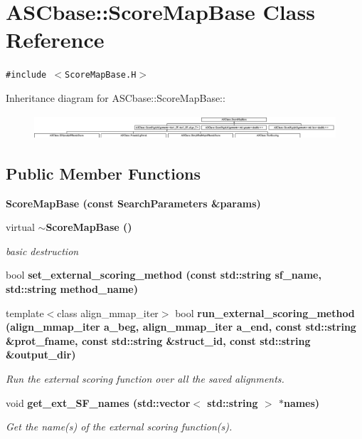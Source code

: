 \section{ASCbase::Score\-Map\-Base Class Reference}
\label{classASCbase_1_1ScoreMapBase}
{\tt \#include $<$Score\-Map\-Base.H$>$}

Inheritance diagram for ASCbase::Score\-Map\-Base::\begin{figure}[H]
\begin{center}
\leavevmode
\includegraphics[height=0.88189cm]{classASCbase_1_1ScoreMapBase}
\end{center}
\end{figure}
\subsection*{Public Member Functions}
\begin{CompactItemize}
\item 
\bf{Score\-Map\-Base} (const \bf{Search\-Parameters} \&params)
\item 
virtual \bf{$\sim$Score\-Map\-Base} ()\label{classASCbase_1_1ScoreMapBase_53cc54d782902810408e5e4ebcbbffd5}

\begin{CompactList}\small\item\em basic destruction \item\end{CompactList}\item 
bool \bf{set\_\-external\_\-scoring\_\-method} (const std::string sf\_\-name, std::string method\_\-name)
\item 
template$<$class align\_\-mmap\_\-iter$>$ bool \bf{run\_\-external\_\-scoring\_\-method} (align\_\-mmap\_\-iter a\_\-beg, align\_\-mmap\_\-iter a\_\-end, const std::string \&prot\_\-fname, const std::string \&struct\_\-id, const std::string \&output\_\-dir)
\begin{CompactList}\small\item\em Run the external scoring function over all the saved alignments. \item\end{CompactList}\item 
void \bf{get\_\-ext\_\-SF\_\-names} (std::vector$<$ std::string $>$ $\ast$names)\label{classASCbase_1_1ScoreMapBase_b5ee9de7e756e9c6ee3058c475a95958}

\begin{CompactList}\small\item\em Get the name(s) of the external scoring function(s). \item\end{CompactList}\end{CompactItemize}
